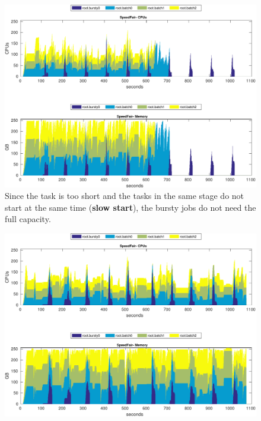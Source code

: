 \begin{figure}
\centering
\includegraphics[width=1.0\linewidth]{fig/b3_res_usage_SpeedFair_BB_1s}
\caption{ Since the task is too short and the tasks in the same stage do not start at the same time (\textbf{slow start}), the bursty jobs do not need the full capacity.}
\label{fig:b3_res_usage_SpeedFair_BB_1s}
\end{figure}

\begin{figure}
\centering
\includegraphics[width=1.0\linewidth]{fig/b3_res_usage_SpeedFair_BB_3s}
\caption{}
\label{fig:b3_res_usage_SpeedFair_BB_3s}
\end{figure}

